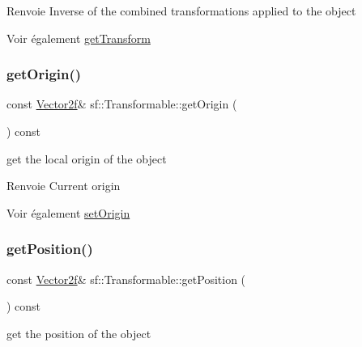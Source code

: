 \begin{DoxyReturn}{Renvoie}
Inverse of the combined transformations applied to the object
\end{DoxyReturn}
\begin{DoxySeeAlso}{Voir également}
\hyperlink{classsf_1_1Transformable_a7f7c3f0bab3f162b13613904fbdbb9ad}{get\+Transform} 
\end{DoxySeeAlso}
\mbox{\label{classsf_1_1Transformable_a37ea3500afac234814a43ce809ef264e}} 
\subsubsection{\texorpdfstring{get\+Origin()}{getOrigin()}}
{\footnotesize\ttfamily const \hyperlink{classsf_1_1Vector2}{Vector2f}\& sf\+::\+Transformable\+::get\+Origin (\begin{DoxyParamCaption}{ }\end{DoxyParamCaption}) const}



get the local origin of the object 

\begin{DoxyReturn}{Renvoie}
Current origin
\end{DoxyReturn}
\begin{DoxySeeAlso}{Voir également}
\hyperlink{classsf_1_1Transformable_a56c67bd80aae8418d13fb96c034d25ec}{set\+Origin} 
\end{DoxySeeAlso}
\mbox{\label{classsf_1_1Transformable_a73f9739bc6e74db2cea154bc8e94ec46}} 
\subsubsection{\texorpdfstring{get\+Position()}{getPosition()}}
{\footnotesize\ttfamily const \hyperlink{classsf_1_1Vector2}{Vector2f}\& sf\+::\+Transformable\+::get\+Position (\begin{DoxyParamCaption}{ }\end{DoxyParamCaption}) const}



get the position of the object 

